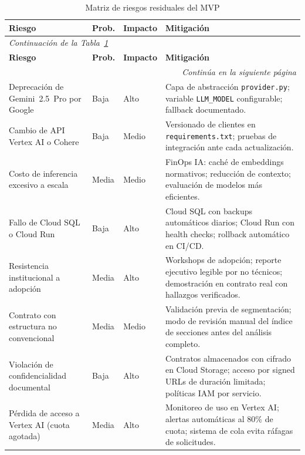 \begin{longtable}{p{3.8cm} p{1.5cm} p{1.5cm} p{6.5cm}}
\caption{Matriz de riesgos residuales del MVP}
\label{tab:riesgos} \\
\toprule
\textbf{Riesgo} & \textbf{Prob.} & \textbf{Impacto} & \textbf{Mitigación} \\
\midrule
\endfirsthead
\multicolumn{4}{l}{\small\itshape Continuación de la Tabla~\ref{tab:riesgos}} \\[4pt]
\toprule
\textbf{Riesgo} & \textbf{Prob.} & \textbf{Impacto} & \textbf{Mitigación} \\
\midrule
\endhead
\midrule
\multicolumn{4}{r}{\small\itshape Continúa en la siguiente página} \\
\endfoot
\bottomrule
\endlastfoot
Deprecación de Gemini~2.5~Pro por Google &
    Baja & Alto &
    Capa de abstracción \texttt{provider.py}; variable \texttt{LLM\_MODEL}
    configurable; fallback documentado. \\[8pt]
Cambio de API Vertex AI o Cohere &
    Baja & Medio &
    Versionado de clientes en \texttt{requirements.txt};
    pruebas de integración ante cada actualización. \\[8pt]
Costo de inferencia excesivo a escala &
    Media & Medio &
    FinOps IA: caché de embeddings normativos; reducción de contexto;
    evaluación de modelos más eficientes. \\[8pt]
Fallo de Cloud SQL o Cloud Run &
    Baja & Alto &
    Cloud SQL con backups automáticos diarios; Cloud Run con health
    checks; rollback automático en CI/CD. \\[8pt]
Resistencia institucional a adopción &
    Media & Alto &
    Workshops de adopción; reporte ejecutivo legible por no técnicos;
    demostración en contrato real con hallazgos verificados. \\[8pt]
Contrato con estructura no convencional &
    Media & Medio &
    Validación previa de segmentación; modo de revisión manual del
    índice de secciones antes del análisis completo. \\[8pt]
Violación de confidencialidad documental &
    Baja & Alto &
    Contratos almacenados con cifrado en Cloud Storage; acceso por
    signed URLs de duración limitada; políticas IAM por servicio. \\[8pt]
Pérdida de acceso a Vertex AI (cuota agotada) &
    Media & Alto &
    Monitoreo de uso en Vertex AI; alertas automáticas al 80\% de cuota;
    sistema de cola evita ráfagas de solicitudes. \\
\end{longtable}

